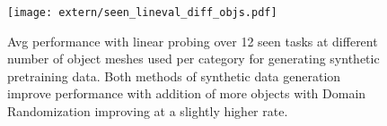 \begin{figure}[h]
    \centering
    \texttt{[image: extern/seen\_lineval\_diff\_objs.pdf]}
    \caption{Avg performance with linear probing over 12 seen tasks at different number of object meshes used per category for generating synthetic pretraining data. Both methods of synthetic data generation improve performance with addition of more objects with Domain Randomization improving at a slightly higher rate.}
    \label{fig:diff_num_objs_lineval}
\end{figure}